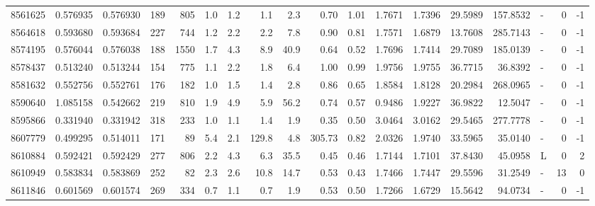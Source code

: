 \begin{tabular}{rrrrrrrrrrrrrrrlrr}
   8561625 & 0.576935 &   0.576930 &  189 &  805 &      1.0 &      1.2 &     1.1 &      2.3 &       0.70 &        1.01 &  1.7671 &  1.7396 &   29.5989 &  157.8532 &             - &        0 &         -1 \\
   8564618 & 0.593680 &   0.593684 &  227 &  744 &      1.2 &      2.2 &     2.2 &      7.8 &       0.90 &        0.81 &  1.7571 &  1.6879 &   13.7608 &  285.7143 &             - &        0 &         -1 \\
   8574195 & 0.576044 &   0.576038 &  188 & 1550 &      1.7 &      4.3 &     8.9 &     40.9 &       0.64 &        0.52 &  1.7696 &  1.7414 &   29.7089 &  185.0139 &             - &        0 &         -1 \\
   8578437 & 0.513240 &   0.513244 &  154 &  775 &      1.1 &      2.2 &     1.8 &      6.4 &       1.00 &        0.99 &  1.9756 &  1.9755 &   36.7715 &   36.8392 &             - &        0 &         -1 \\
   8581632 & 0.552756 &   0.552761 &  176 &  182 &      1.0 &      1.5 &     1.4 &      2.8 &       0.86 &        0.65 &  1.8584 &  1.8128 &   20.2984 &  268.0965 &             - &        0 &         -1 \\
   8590640 & 1.085158 &   0.542662 &  219 &  810 &      1.9 &      4.9 &     5.9 &     56.2 &       0.74 &        0.57 &  0.9486 &  1.9227 &   36.9822 &   12.5047 &             - &        0 &         -1 \\
   8595866 & 0.331940 &   0.331942 &  318 &  233 &      1.0 &      1.1 &     1.4 &      1.9 &       0.35 &        0.50 &  3.0464 &  3.0162 &   29.5465 &  277.7778 &             - &        0 &         -1 \\
   8607779 & 0.499295 &   0.514011 &  171 &   89 &      5.4 &      2.1 &   129.8 &      4.8 &     305.73 &        0.82 &  2.0326 &  1.9740 &   33.5965 &   35.0140 &             - &        0 &         -1 \\
   8610884 & 0.592421 &   0.592429 &  277 &  806 &      2.2 &      4.3 &     6.3 &     35.5 &       0.45 &        0.46 &  1.7144 &  1.7101 &   37.8430 &   45.0958 &             L &        0 &          2 \\
   8610949 & 0.583834 &   0.583869 &  252 &   82 &      2.3 &      2.6 &    10.8 &     14.7 &       0.53 &        0.43 &  1.7466 &  1.7447 &   29.5596 &   31.2549 &             - &       13 &          0 \\
   8611846 & 0.601569 &   0.601574 &  269 &  334 &      0.7 &      1.1 &     0.7 &      1.9 &       0.53 &        0.50 &  1.7266 &  1.6729 &   15.5642 &   94.0734 &             - &        0 &         -1 \\

\end{tabular}
